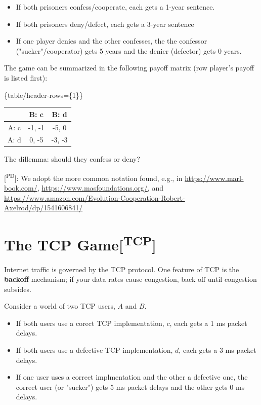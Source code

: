 \documentclass[11pt]{article}
\begin{document}
\begin{itemize}
\item If both prisoners confess/cooperate, each gets a 1-year sentence.
\item If both prisoners deny/defect, each gets a 3-year sentence
\item If one player denies and the other confesses, the the confessor ("sucker"/cooperator) gets 5 years and the denier (defector) gets 0 years.
\end{itemize}

The game can be summarized in the following payoff matrix (row player's payoff is listed first):


\tagpdfsetup\{table/header-rows=\{1\}\}
\begin{tabular}{|c|c|c|}\hline
       & B: c         & B: d         \\\hline
A: c & -1, -1 & -5, 0 \\\hline
A: d & 0, -5  & -3, -3 \\\hline
\end{tabular}


The dillemma: should they confess or deny?

{[}\textsuperscript{PD}]: We adopt the more common notation found, e.g., in \url{https://www.marl-book.com/}, \url{https://www.masfoundations.org/}, and \url{https://www.amazon.com/Evolution-Cooperation-Robert-Axelrod/dp/1541606841/}
\section{The TCP Game[\textsuperscript{TCP}]}
\label{sec:org7c42939}

Internet traffic is governed by the TCP protocol. One feature of TCP is the \textbf{backoff} mechanism; if your data rates cause congestion, back off until congestion subsides.

Consider a world of two TCP users, \(A\) and \(B\).

\begin{itemize}
\item If both users use a corect TCP implementation, \(c\), each gets a 1 ms packet delays.
\item If both users use a defective TCP implementation, \(d\), each gets a 3 ms packet delays.
\item If one user uses a correct implmentation and the other a defective one, the correct user (or "sucker") gets 5 ms packet delays and the other gets 0 ms delays.
\end{itemize}
\end{document}
